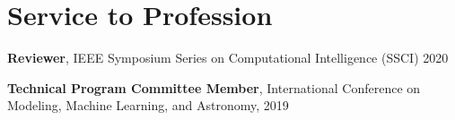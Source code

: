 \section{Service to Profession}
 \resumeSubHeadingListStart
    \item
      {\textbf{Reviewer}, IEEE Symposium Series on Computational Intelligence (SSCI) 2020}
    \item
      {\textbf{Technical Program Committee Member}, International Conference on Modeling, Machine Learning, and Astronomy, 2019}
 \resumeSubHeadingListEnd